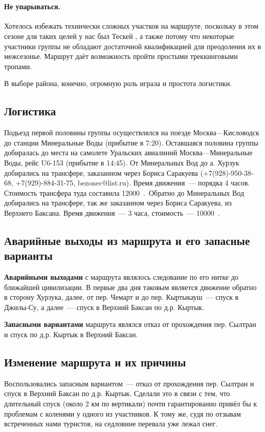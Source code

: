 ﻿﻿\paragraph{﻿﻿Не упарываться.} Хотелось избежать технически сложных участков на маршруте, поскольку в этом сезоне для таких целей у нас был Тескей \cite{teskei2025ostapiv}, а также потому что некоторые участники группы не обладают достаточной квалификацией для преодоления их в межсезонье. Маршрут даёт возможность пройти простыми треккинговыми тропами.

В выборе района, конечно, огромную роль играла и простота логистики.

\subsection{Логистика}
Подьезд первой половины группы осуществлялся на поезде Москва---Кисловодск до станции Минеральные Воды (прибытие в 7:20). Оставшаяся половина группы добиралась до места на самолете Уральских авиалиний Москва---Минеральные Воды, рейс U6-153 (прибытие в 14:45). От Минеральных Вод до а. Хурзук добирались на трансфере, заказанном через Бориса Саракуева (+7(928)-950-38-68, +7(929)-884-31-75, bezonec@list.ru). Время движения~--- порядка 4 часов. Стоимость трансфера туда составила 12000~\faRub.~Обратно до Минеральных Вод добирались на трансфере, так же заказанном через Бориса Саракуева, из Верхнего Баксана. Время движения~--- 3 часа, стоимость~--- 10000~\faRub.

\subsection{Аварийные выходы из маршрута и его запасные варианты}
\textbf{Аварийными выходами} с маршрута являлось следование по его нитке до ближайшей цивилизации. В первые два дня таковым является движение обратно в сторону Хурзука, далее, от пер. Чемарт и до пер. Кыртыкауш~--- спуск в Джилы-Су, а далее~--- спуск в Верхний Баксан по д.р. Кыртык.


\textbf{Запасными вариантами} маршрута являлся отказ от прохождения пер. Сылтран и спуск по д.р. Кыртык в Верхний Баксан.


\subsection{Изменение маршрута и их причины}
Воспользовались запасным вариантом~--- отказ от прохождения пер. Сылтран и спуск в Верхний Баксан по д.р. Кыртык. Сделали это в связи с тем, что длительный спуск (около 2 км по вертикали) почти гарантированно привёл бы к проблемам с коленями у одного из участников. К тому же, судя по отзывам встреченных нами туристов, на седловине перевала уже лежал снег.

